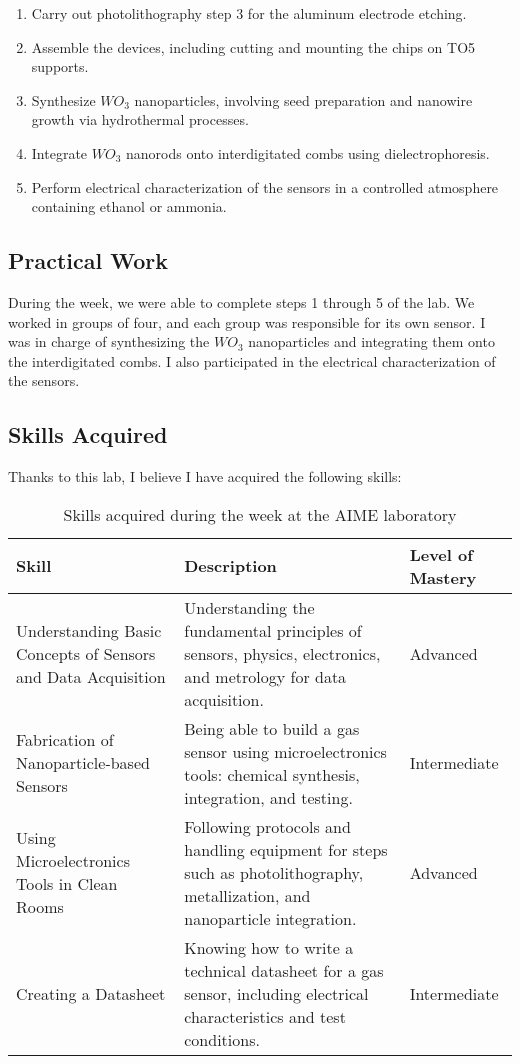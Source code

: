 \begin{enumerate}
    \item Carry out photolithography step 3 for the aluminum electrode etching.
    \item Assemble the devices, including cutting and mounting the chips on TO5 supports.
    \item Synthesize $WO_3$ nanoparticles, involving seed preparation and nanowire growth via hydrothermal processes.
    \item Integrate $WO_3$ nanorods onto interdigitated combs using dielectrophoresis.
    \item Perform electrical characterization of the sensors in a controlled atmosphere containing ethanol or ammonia.
\end{enumerate}

\subsection{Practical Work}

During the week, we were able to complete steps 1 through 5 of the lab. We worked in groups of four, and each group was responsible for its own sensor. I was in charge of synthesizing the $WO_3$ nanoparticles and integrating them onto the interdigitated combs. I also participated in the electrical characterization of the sensors.

\subsection{Skills Acquired}

\indent \indent Thanks to this lab, I believe I have acquired the following skills:

\begin{table}[H]
    \centering
    \begin{tabular}{|p{5cm}|p{8cm}|p{3cm}|}
    \hline
    \textbf{Skill} & \textbf{Description} & \textbf{Level of Mastery} \\
    \hline
    Understanding Basic Concepts of Sensors and Data Acquisition & 
    Understanding the fundamental principles of sensors, physics, electronics, and metrology for data acquisition. & 
    Advanced \\
    \hline
    Fabrication of Nanoparticle-based Sensors & 
    Being able to build a gas sensor using microelectronics tools: chemical synthesis, integration, and testing. & 
    Intermediate \\
    \hline
    Using Microelectronics Tools in Clean Rooms & 
    Following protocols and handling equipment for steps such as photolithography, metallization, and nanoparticle integration. & 
    Advanced \\
    \hline
    Creating a Datasheet & 
    Knowing how to write a technical datasheet for a gas sensor, including electrical characteristics and test conditions. & 
    Intermediate \\
    \hline
    \end{tabular}
    \caption{Skills acquired during the week at the AIME laboratory}
\end{table}

